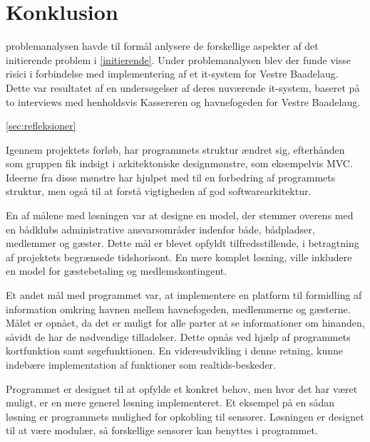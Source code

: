\chapter{Konklusion}
\label{cha:konklusion}

problemanalysen havde til formål anlysere de forskellige aspekter af det initierende problem i \cref{initierende}.  
Under problemanalysen blev der funde visse risici i forbindelse med implementering af et it-system for Vestre Baadelaug.
Dette var resultatet af en undersøgelser af deres nuværende it-system, baseret på to interviews med henholdsvis Kassereren og havnefogeden for  Vestre Baadelaug. 

\cref{sec:refleksioner} 

Igennem projektets forløb, har programmets struktur ændret sig, efterhånden som gruppen fik indsigt i arkitektoniske designmønstre, som eksempelvis MVC. Ideerne fra disse mønstre har hjulpet med til en forbedring af programmets struktur, men også til at forstå vigtigheden af god softwarearkitektur.

En af målene med løsningen var at designe en model, der stemmer overens med en bådklubs administrative ansvarsområder indenfor både, bådpladser, medlemmer og gæster. Dette mål er blevet opfyldt tilfredsstillende, i betragtning af projektets begrænsede tidshorisont. En mere komplet løsning, ville inkludere en model for gæstebetaling og medlemskontingent.

Et andet mål med programmet var, at implementere en platform til formidling af information omkring havnen mellem havnefogeden, medlemmerne og gæsterne. Målet er opnået, da det er muligt for alle parter at se informationer om hinanden, såvidt de har de nødvendige tilladelser. Dette opnås ved hjælp af programmets kortfunktion samt søgefunktionen. En videreudvikling i denne retning, kunne indebære implementation af funktioner som realtids-beskeder.

Programmet er designet til at opfylde et konkret behov, men hvor det har været muligt, er en mere generel løsning implementeret. Et eksempel på en sådan løsning er programmets mulighed for opkobling til sensorer. Løsningen er designet til at være modulær, så forskellige sensorer kan benyttes i programmet.

